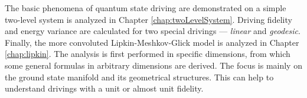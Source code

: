 The basic phenomena of quantum state driving are demonstrated on a simple two-level system is analyzed in Chapter \ref{chap:twoLevelSystem}. Driving fidelity and energy variance are calculated for two special drivings — \emph{linear} and \emph{geodesic}. Finally, the more convoluted Lipkin-Meshkov-Glick model is analyzed in Chapter \ref{chap:lipkin}. The analysis is first performed in specific dimensions, from which some general formulas in arbitrary dimensions are derived. The focus is mainly on the ground state manifold and its geometrical structures. This can help to understand drivings with a unit or almost unit fidelity.